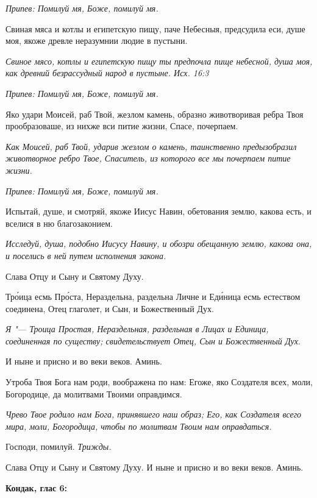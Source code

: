 \itshape Припев:\normalfont{} Помилуй мя, Боже, помилуй мя.


Свиная мяса и котлы и египетскую пищу, паче Небесныя, предсудила еси, душе моя, якоже древле неразумнии людие в пустыни.


\itshape Свиное мясо, котлы и египетскую пищу ты предпочла пище небесной, душа моя, как древний безрассудный народ в пустыне. Исх. 16:3\normalfont{}


\itshape Припев:\normalfont{} Помилуй мя, Боже, помилуй мя.


Яко удари Моисей, раб Твой, жезлом камень, образно животворивая ребра Твоя прообразоваше, из нихже вси питие жизни, Спасе, почерпаем.


\itshape Как Моисей, раб Твой, ударив жезлом о камень, таинственно предызобразил животворное ребро Твое, Спаситель, из которого все мы почерпаем питие жизни.\normalfont{}


\itshape Припев:\normalfont{} Помилуй мя, Боже, помилуй мя.


Испытай, душе, и смотряй, якоже Иисус Навин, обетования землю, какова есть, и вселися в ню благозаконием.


\itshape Исследуй, душа, подобно Иисусу Навину, и обозри обещанную землю, какова она, и поселись в ней путем исполнения закона.\normalfont{}


Слава Отцу и Сыну и Святому Духу.


Тро́ица есмь Про́ста, Нераздельна, раздельна Личне и Еди́ница есмь естеством соединена, Отец глаголет, и Сын, и Божественный Дух.


\itshape Я "--- Троица Простая, Нераздельная, раздельная в Лицах и Единица, соединенная по существу; свидетельствует Отец, Сын и Божественный Дух.\normalfont{}


И ныне и присно и во веки веков. Аминь.


Утроба Твоя Бога нам роди, воображена по нам: Егоже, яко Создателя всех, моли, Богородице, да молитвами Твоими оправдимся.


\itshape Чрево Твое родило нам Бога, принявшего наш образ; Его, как Создателя всего мира, моли, Богородица, чтобы по молитвам Твоим нам оправдаться.\normalfont{}


Господи, помилуй. \itshape Трижды.\normalfont{}


Слава Отцу и Сыну и Святому Духу. И ныне и присно и во веки веков. Аминь.





\bfseries Кондак, глас 6:\normalfont{}


